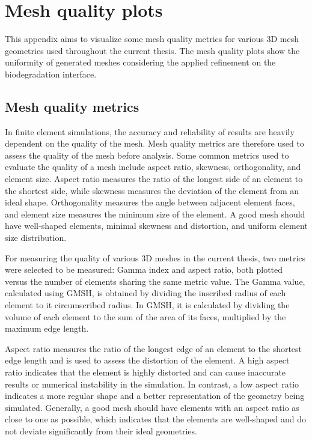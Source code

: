 \chapter{Mesh quality plots}\label{ch:appendix}

This appendix aims to visualize some mesh quality metrics for various 3D mesh geometries used throughout the current thesis. The mesh quality plots show the uniformity of generated meshes considering the applied refinement on the biodegradation interface.

\section{Mesh quality metrics}

In finite element simulations, the accuracy and reliability of results are heavily dependent on the quality of the mesh. Mesh quality metrics are therefore used to assess the quality of the mesh before analysis. Some common metrics used to evaluate the quality of a mesh include aspect ratio, skewness, orthogonality, and element size. Aspect ratio measures the ratio of the longest side of an element to the shortest side, while skewness measures the deviation of the element from an ideal shape. Orthogonality measures the angle between adjacent element faces, and element size measures the minimum size of the element. A good mesh should have well-shaped elements, minimal skewness and distortion, and uniform element size distribution.

For measuring the quality of various 3D meshes in the current thesis, two metrics were selected to be measured: Gamma index and aspect ratio, both plotted versus the number of elements sharing the same metric value. The Gamma value, calculated using GMSH, is obtained by dividing the inscribed radius of each element to it circumscribed radius. In GMSH, it is calculated by dividing the volume of each element to the sum of the area of its faces, multiplied by the maximum edge length. 

Aspect ratio measures the ratio of the longest edge of an element to the shortest edge length and is used to assess the distortion of the element. A high aspect ratio indicates that the element is highly distorted and can cause inaccurate results or numerical instability in the simulation. In contrast, a low aspect ratio indicates a more regular shape and a better representation of the geometry being simulated. Generally, a good mesh should have elements with an aspect ratio as close to one as possible, which indicates that the elements are well-shaped and do not deviate significantly from their ideal geometries. 

